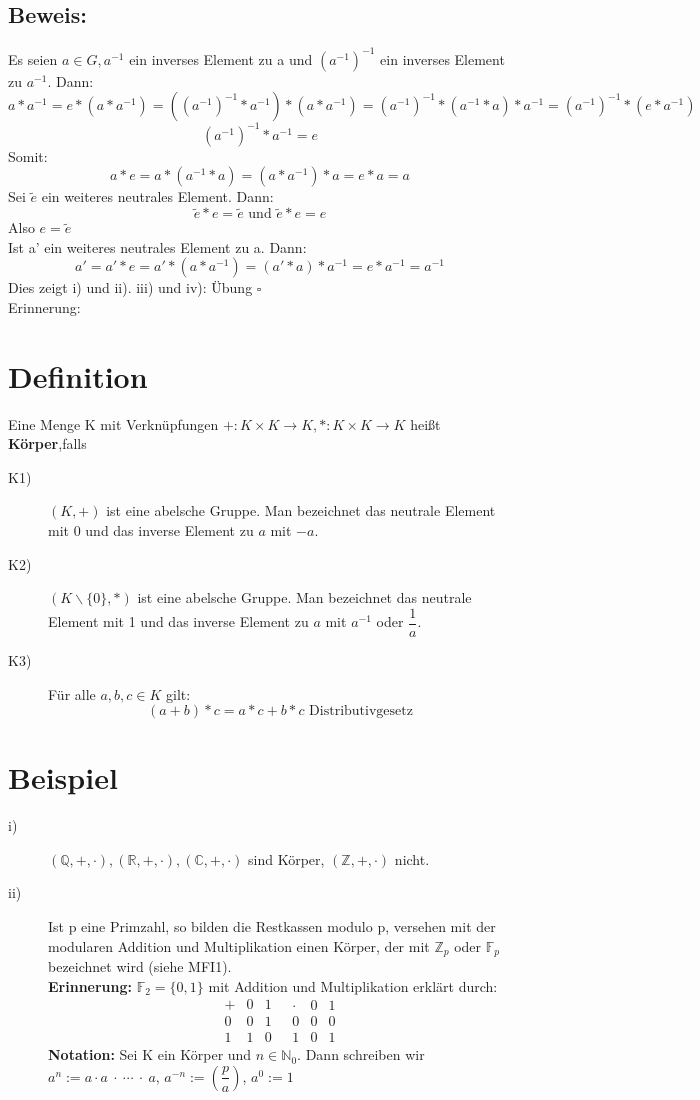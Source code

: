 \documentclass{scrbook}
\begin{document}
\subsection*{Beweis:}
Es seien \(a\in G, a^{-1}\) ein inverses Element zu a und \((a^{-1})^{-1}\) ein inverses Element zu \(a^{-1}\). Dann:
\[
a*a^{-1} = e*(a*a^{-1}) =( (a^{-1})^{-1}*a^{-1})*(a*a^{-1})=(a^{-1})^{-1}*(a^{-1} *a)*a^{-1}=(a^{-1})^{-1}*(e*a^{-1})
\]
\[
(a^{-1})^{-1}*a^{-1} = e
\]
Somit:
\[
a*e = a*(a^{-1}*a) = (a*a^{-1})*a = e*a =a
\]
Sei \(\tilde{e}\) ein weiteres neutrales Element. Dann:
\[
\tilde{e}*e = \tilde{e} \text{ und } \tilde{e}*e = e
\]
Also \(e = \tilde{e}\)\\
Ist a' ein weiteres neutrales Element zu a. Dann:
\[
a' = a'*e=a'*(a*a^{-1})=(a'*a)*a^{-1} = e*a^{-1} = a^{-1}
\]
Dies zeigt i) und ii). iii) und iv): Übung \(\square\)\\
Erinnerung:
\section{Definition}
Eine Menge K mit Verknüpfungen \(+: K \times K \rightarrow K, *: K \times K \rightarrow K\) heißt \textbf{Körper},falls
\begin{description}
\item[K1)] \((K,+)\) ist eine abelsche Gruppe. Man bezeichnet das neutrale Element mit 0 und das inverse Element zu \(a\) mit \(-a\).
\item[K2)]\((K\backslash \{0\},*)\) ist eine abelsche Gruppe. Man bezeichnet das neutrale Element mit 1 und das inverse Element zu \(a\) mit \(a^{-1}\) oder \(\dfrac{1}{a}\).
\item[K3)]Für alle \(a,b,c \in K\) gilt:
\[
(a+b)*c=a*c+b*c \text{ Distributivgesetz}
\]
\end{description}
\section{Beispiel}
\begin{description}
\item[i)] \((\mathbb{Q},+,\cdot),(\mathbb{R},+,\cdot),(\mathbb{C},+,\cdot)\) sind Körper, \((\mathbb{Z},+,\cdot)\) nicht.
\item[ii)] Ist p eine Primzahl, so bilden die Restkassen modulo p, versehen mit der modularen Addition und Multiplikation einen Körper, der mit \(\mathbb{Z}_p\) oder \(\mathbb{F}_p\) bezeichnet wird (siehe MFI1).\\
\textbf{Erinnerung:} \(\mathbb{F}_2 = \{0,1\}\) mit Addition und Multiplikation erklärt durch:
\[
\begin{array}{c|cc}
+&0&1\\
\hline
0&0&1\\
1&1&0
\end{array}
\text{    }
\begin{array}{c|cc}
\cdot&0&1\\
\hline
0&0&0\\
1&0&1
\end{array}
\]
\textbf{Notation:} Sei K ein Körper und \(n\in \mathbb{N}_0\). Dann schreiben wir \(a^n:=a\cdot a\ \cdot\  \cdots \ \cdot \  a\), \(a^{-n}:= \left(\dfrac{p}{a}\right)\), \(a^0:=1\)
\end{description}
\end{document}
